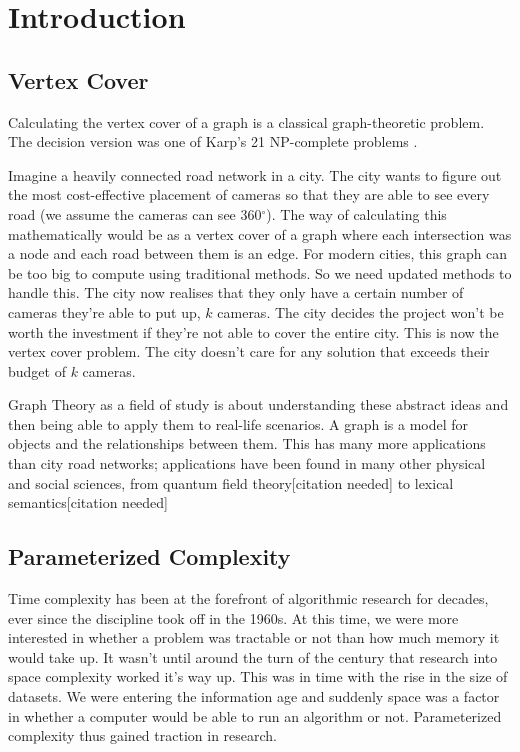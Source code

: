 \section{Introduction}

\subsection{Vertex Cover}

Calculating the vertex cover of a graph is a classical graph-theoretic
problem. The decision version was one of Karp's 21 NP-complete
problems \cite{karp1972reducibility}.

Imagine a heavily connected road network in a city. The city
wants to figure out the most cost-effective placement of cameras so that
they are able to see every road (we assume the cameras can see
360\(^\circ\)). The way of calculating this mathematically would be as a
vertex cover of a graph where each intersection was a node and each road
between them is an edge. For modern cities, this graph can be too big
to compute using traditional methods. So we need updated methods to
handle this. The city now realises that they only have a certain number
of cameras they're able to put up, \(k\) cameras. The city decides the
project won't be worth the investment if they're not able to cover the
entire city. This is now the vertex cover problem. The city doesn't care
for any solution that exceeds their budget of \(k\) cameras.

Graph Theory as a field of study is about understanding these abstract
ideas and then being able to apply them to real-life scenarios. A graph
is a model for objects and the relationships between them. This has many
more applications than city road networks; applications have been found
in many other physical and social sciences, from quantum field
theory{[}citation needed{]} to lexical semantics{[}citation needed{]}

\subsection{Parameterized Complexity}

Time complexity has been at the forefront of algorithmic research for
decades, ever since the discipline took off in the 1960s. At this time,
we were more interested in whether a problem was tractable or not than
how much memory it would take up. It wasn't until around the turn of the
century that research into space complexity worked it's way up. This was in
time with the rise in the size of datasets. We were entering the
information age and suddenly space was a factor in whether a computer
would be able to run an algorithm or not. Parameterized complexity thus
gained traction in research.

